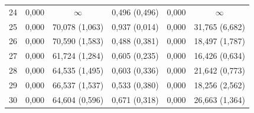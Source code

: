 \begin{tabular}{l c c c c c}
24 & 0,000 & $\infty$ & 0,496 (0,496) & 0,000 & $\infty$ \\
25 & 0,000 & 70,078 (1,063) & 0,937 (0,014) & 0,000 & 31,765 (6,682) \\
26 & 0,000 & 70,590 (1,583) & 0,488 (0,381) & 0,000 & 18,497 (1,787) \\
27 & 0,000 & 61,724 (1,284) & 0,605 (0,235) & 0,000 & 16,426 (0,634) \\
28 & 0,000 & 64,535 (1,495) & 0,603 (0,336) & 0,000 & 21,642 (0,773) \\
29 & 0,000 & 66,537 (1,537) & 0,533 (0,380) & 0,000 & 18,256 (2,562) \\
30 & 0,000 & 64,604 (0,596) & 0,671 (0,318) & 0,000 & 26,663 (1,364) \\
\hline 
 \end{tabular}
